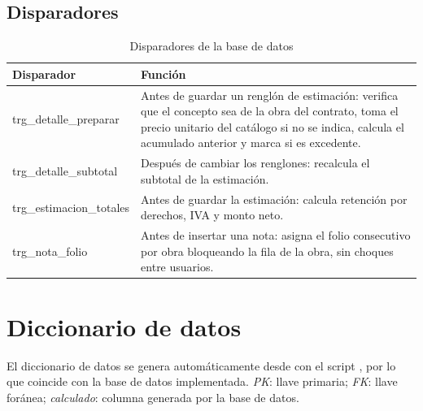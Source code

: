 \section{Disparadores}
\begin{xltabular}{\linewidth}{@{}>{\ttfamily\small}p{5.4cm}>{\small}X@{}}
\caption{Disparadores de la base de datos}\label{tab:disparadores}\\
\toprule
\normalfont\sffamily\bfseries Disparador & \sffamily\bfseries Función\\\midrule\endfirsthead
\bottomrule\endfoot
trg\_detalle\_preparar & Antes de guardar un renglón de estimación: verifica que el concepto sea de la obra del contrato, toma el precio unitario del catálogo si no se indica, calcula el acumulado anterior y marca si es excedente.\\
trg\_detalle\_subtotal & Después de cambiar los renglones: recalcula el subtotal de la estimación.\\
trg\_estimacion\_totales & Antes de guardar la estimación: calcula retención por derechos, IVA y monto neto.\\
trg\_nota\_folio & Antes de insertar una nota: asigna el folio consecutivo por obra bloqueando la fila de la obra, sin choques entre usuarios.\\
\end{xltabular}

\chapter{Diccionario de datos}
El diccionario de datos se genera automáticamente desde  con el script , por lo que coincide con la base de datos implementada. \emph{PK}: llave primaria; \emph{FK}: llave foránea; \emph{calculado}: columna generada por la base de datos.


